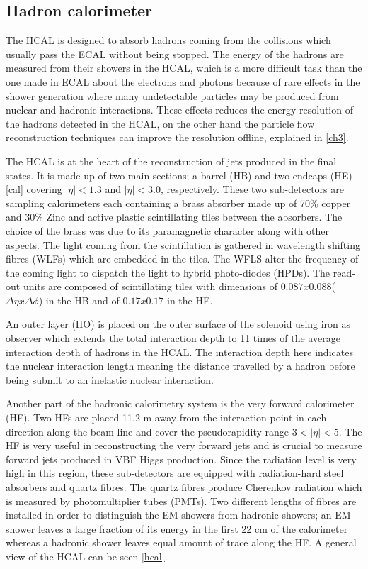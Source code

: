 \subsection{Hadron calorimeter}

The HCAL\cite{CMS:1997xji} is designed to absorb hadrons coming from the collisions which usually pass the ECAL without being stopped. The energy of the hadrons are measured from their showers in the HCAL, which is a more difficult task than the one made in ECAL about the electrons and photons because of rare effects in the shower generation where many undetectable particles may be produced from nuclear and hadronic interactions. These effects reduces the energy resolution of the hadrons detected in the HCAL, on the other hand the particle flow reconstruction techniques can improve the resolution offline, explained in \autoref{ch3}.

The HCAL is at the heart of the reconstruction of jets produced in the final states. It is made up of two main sections; a barrel (HB) and two endcaps (HE) \autoref{cal} covering $|\eta|<1.3$ and $|\eta|<3.0$, respectively. These two sub-detectors are sampling calorimeters each containing a brass absorber made up of 70\% copper and 30\% Zinc and active plastic scintillating tiles between the absorbers. The choice of the brass was due to its paramagnetic character along with other aspects. The light coming from the scintillation is gathered in wavelength shifting fibres (WLFs) which are embedded in the tiles. The WFLS alter the frequency of the coming light to dispatch the light to hybrid photo-diodes (HPDs). The read-out units are composed of scintillating tiles with dimensions of $0.087x0.088$($\Delta\eta x\Delta\phi$) in the HB and of $0.17x0.17$ in the HE.

An outer layer (HO) is placed on the outer surface of the solenoid using iron as observer which extends the total interaction depth to 11 times of the average interaction depth of hadrons in the HCAL. The interaction depth here indicates the nuclear interaction length meaning the distance travelled by a hadron before being submit to an inelastic nuclear interaction.

Another part of the hadronic calorimetry system is the very forward calorimeter (HF). Two HFs are placed 11.2 m away from the interaction point in each direction along the beam line and cover the pseudorapidity range $3<|\eta|<5$. The HF is very useful in reconstructing the very forward jets and is crucial to measure forward jets produced in VBF Higgs production. Since the radiation level is very high in this region, these sub-detectors are equipped with radiation-hard steel absorbers and quartz fibres. The quartz fibres produce Cherenkov radiation which is measured by photomultiplier tubes (PMTs). Two different lengths of fibres are installed in order to distinguish the EM showers from hadronic showers; an EM shower leaves a large fraction of its energy in the first 22 cm of the calorimeter whereas a hadronic shower leaves equal amount of trace along the HF. A general view of the HCAL can be seen \autoref{hcal}.

